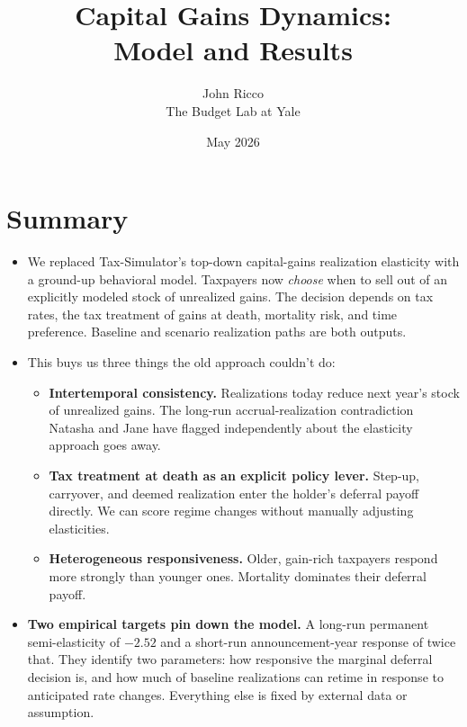 \documentclass[11pt]{article}
\title{\vspace{-2em}Capital Gains Dynamics:\\Model and Results}
\author{John Ricco\\The Budget Lab at Yale}
\date{May 2026}
\begin{document}
\maketitle

\section*{Summary}

\begin{itemize}
  \item We replaced Tax-Simulator's top-down capital-gains realization
        elasticity with a ground-up behavioral model. Taxpayers now
        \emph{choose} when to sell out of an explicitly modeled stock of
        unrealized gains. The decision depends on tax rates, the tax
        treatment of gains at death, mortality risk, and time preference.
        Baseline and scenario realization paths are both outputs.

  \item This buys us three things the old approach couldn't do:
    \begin{itemize}
       \item \textbf{Intertemporal consistency.} Realizations today reduce
             next year's stock of unrealized gains. The long-run
             accrual-realization contradiction Natasha and Jane have flagged independently about
             the elasticity approach goes away.
       \item \textbf{Tax treatment at death as an explicit policy lever.}
             Step-up, carryover, and deemed realization enter the holder's
             deferral payoff directly. We can score regime changes
             without manually adjusting elasticities.
       \item \textbf{Heterogeneous responsiveness.} Older, gain-rich
             taxpayers respond more strongly than younger ones. Mortality
             dominates their deferral payoff.
    \end{itemize}

  \item \textbf{Two empirical targets pin down the model.} A long-run
        permanent semi-elasticity of $-2.52$ and a short-run
        announcement-year response of twice that. They identify two
        parameters: how responsive the marginal deferral decision is, and
        how much of baseline realizations can retime in response to
        anticipated rate changes. Everything else is fixed by external
        data or assumption.


\end{itemize}
\end{document}
